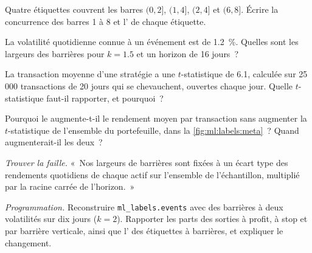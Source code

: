 \begin{exercise}[$\star$]\label{exo:ml:targets-labels-and-sample-weights:2}
Quatre étiquettes couvrent les barres $(0,2]$, $(1,4]$, $(2,4]$ et $(6,8]$. Écrire la concurrence des barres 1 à 8 et
l' de chaque étiquette.
\end{exercise}

\begin{exercise}[$\star$]\label{exo:ml:targets-labels-and-sample-weights:3}
La volatilité quotidienne connue à un événement est de 1.2~\%. Quelles sont les largeurs des barrières pour $k = 1.5$ et un horizon de 16 jours~?
\end{exercise}

\begin{exercise}[$\star\star$]\label{exo:ml:targets-labels-and-sample-weights:4}
La transaction moyenne d'une stratégie a une $t$-statistique de 6.1, calculée sur 25\,000 transactions de 20 jours qui se chevauchent, ouvertes chaque jour.
Quelle $t$-statistique faut-il rapporter, et pourquoi~?
\end{exercise}

\begin{exercise}[$\star\star$]\label{exo:ml:targets-labels-and-sample-weights:5}
Pourquoi le  augmente-t-il le rendement moyen par transaction sans augmenter la $t$-statistique de l'ensemble du portefeuille, dans
la \cref{fig:ml:labels:meta}~? Quand augmenterait-il les deux~?
\end{exercise}

\begin{exercise}[$\star\star$]\label{exo:ml:targets-labels-and-sample-weights:6}
\emph{Trouver la faille.} «~Nos largeurs de barrières sont fixées à un écart type des rendements quotidiens de chaque actif sur l'ensemble de
l'échantillon, multiplié par la racine carrée de l'horizon.~»
\end{exercise}

\begin{exercise}[$\star\star\star$]\label{exo:ml:targets-labels-and-sample-weights:7}
\emph{Programmation.} Reconstruire \texttt{ml\_labels.events} avec des barrières à deux volatilités sur dix jours ($k = 2$). Rapporter les parts
des sorties à profit, à stop et par barrière verticale, ainsi que l' des étiquettes à barrières, et expliquer le changement.
\end{exercise}

